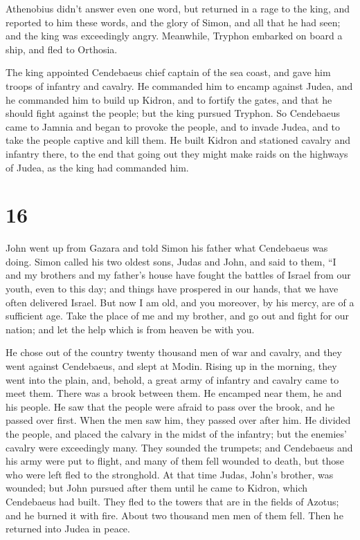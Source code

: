 Athenobius didn't answer even one word,  but returned in
a rage to the king, and reported to him these words, and the glory of
Simon, and all that he had seen; and the king was exceedingly angry.
 Meanwhile, Tryphon embarked on board a ship, and fled to
Orthosia.

 The king appointed Cendebaeus chief captain of the sea
coast, and gave him troops of infantry and cavalry.  He
commanded him to encamp against Judea, and he commanded him to build up
Kidron, and to fortify the gates, and that he should fight against the
people; but the king pursued Tryphon.  So Cendebaeus came
to Jamnia and began to provoke the people, and to invade Judea, and to
take the people captive and kill them.  He built Kidron
and stationed cavalry and infantry there, to the end that going out they
might make raids on the highways of Judea, as the king had commanded
him.

\hypertarget{section-15}{%
\section{16}\label{section-15}}

 John went up from Gazara and told Simon his father what
Cendebaeus was doing.  Simon called his two oldest sons,
Judas and John, and said to them, ``I and my brothers and my father's
house have fought the battles of Israel from our youth, even to this
day; and things have prospered in our hands, that we have often
delivered Israel.  But now I am old, and you moreover, by
his mercy, are of a sufficient age. Take the place of me and my brother,
and go out and fight for our nation; and let the help which is from
heaven be with you.

 He chose out of the country twenty thousand men of war
and cavalry, and they went against Cendebaeus, and slept at Modin.
 Rising up in the morning, they went into the plain, and,
behold, a great army of infantry and cavalry came to meet them. There
was a brook between them.  He encamped near them, he and
his people. He saw that the people were afraid to pass over the brook,
and he passed over first. When the men saw him, they passed over after
him.  He divided the people, and placed the calvary in the
midst of the infantry; but the enemies' cavalry were exceedingly many.
 They sounded the trumpets; and Cendebaeus and his army
were put to flight, and many of them fell wounded to death, but those
who were left fled to the stronghold.  At that time Judas,
John's brother, was wounded; but John pursued after them until he came
to Kidron, which Cendebaeus had built.  They fled to the
towers that are in the fields of Azotus; and he burned it with fire.
About two thousand men men of them fell. Then he returned into Judea in
peace.

